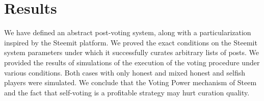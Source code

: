 \section{Results}
  We have defined an abstract post-voting system, along with a particularization
  inspired by the Steemit platform. We proved the exact conditions on the
  Steemit system parameters under which it successfully curates arbitrary lists
  of posts. We provided the results of simulations of the execution of the
  voting procedure under various conditions. Both cases with only honest and
  mixed honest and selfish players were simulated. We conclude that the Voting
  Power mechanism of Steem and the fact that self-voting is a profitable
  strategy may hurt curation quality.

